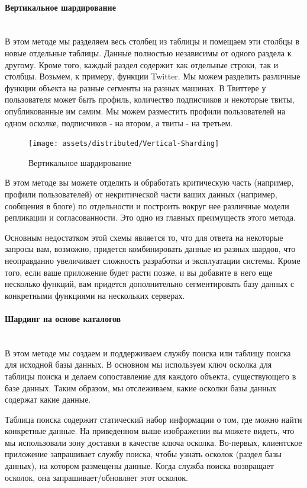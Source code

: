 \paragraph{Вертикальное шардирование} ~\\
В этом методе мы разделяем весь столбец из таблицы и помещаем эти столбцы в новые отдельные таблицы. Данные полностью
независимы от одного раздела к другому. Кроме того, каждый раздел содержит как отдельные строки, так и столбцы. Возьмем,
к примеру, функции Twitter. Мы можем разделить различные функции объекта на разные сегменты на разных машинах. В
Твиттере у пользователя может быть профиль, количество подписчиков и некоторые твиты, опубликованные им самим. Мы можем
разместить профили пользователей на одном осколке, подписчиков - на втором, а твиты - на третьем.

\begin{figure}[H]
    \centering
    \texttt{[image: assets/distributed/Vertical-Sharding]}
    \caption{Вертикальное шардирование}
    \label{fig:Vertical-Sharding}
\end{figure}

В этом методе вы можете отделить и обработать критическую часть (например, профили пользователей) от некритической части
ваших данных (например, сообщения в блоге) по отдельности и построить вокруг нее различные модели репликации и
согласованности. Это одно из главных преимуществ этого метода.

Основным недостатком этой схемы является то, что для ответа на некоторые запросы вам, возможно, придется комбинировать
данные из разных шардов, что неоправданно увеличивает сложность разработки и эксплуатации системы. Кроме того, если
ваше приложение будет расти позже, и вы добавите в него еще несколько функций, вам придется дополнительно сегментировать
базу данных с конкретными функциями на нескольких серверах. \autocite{DatabaseSharding}

\paragraph{Шардинг на основе каталогов} ~\\
В этом методе мы создаем и поддерживаем службу поиска или таблицу поиска для исходной базы данных. В основном мы
используем ключ осколка для таблицы поиска и делаем сопоставление для каждого объекта, существующего в базе данных.
Таким образом, мы отслеживаем, какие осколки базы данных содержат какие данные.

Таблица поиска содержит статический набор информации о том, где можно найти конкретные данные. На приведенном выше
изображении вы можете видеть, что мы использовали зону доставки в качестве ключа осколка. Во-первых, клиентское
приложение запрашивает службу поиска, чтобы узнать осколок (раздел базы данных), на котором размещены данные. Когда
служба поиска возвращает осколок, она запрашивает/обновляет этот осколок.

